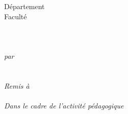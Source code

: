\documentclass[main.tex]{subfiles}
\begin{document}
\begin{titlepage}
		\centering
            {
				\large Département \Departement \\
				\large Faculté \Faculte \\
				\large \University \\[2.75cm]
		}
		{
				{\Large\color{\MasterColor}{\Titre}} \\
				{\Large\color{\MasterColor}{\SousTitre}} \\[2.75cm]
		}
		{
				\emph{\large par} \\[0.33cm]
				{\large\CoequipierA} \\
				{\large\CoequipierB} \\ [2.75cm]
				\emph{\large Remis à} \\[0.33cm]
				\large\Enseignant \\[2.75cm]
		}
            {
				\emph{\large Dans le cadre de l'activité pédagogique} \\[0.33cm]
				{\large\Activite} \\[2.75cm]
		}
            {
            \large \Lieu \\
		\large \Date
            }

\end{titlepage}
\end{document}
